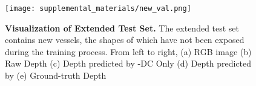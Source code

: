 \begin{table}[!t]
\centering
\caption{\textbf{Inference on Extended Test Set.} We assess the performance of various models using the extended Test set. The arrows beside the metrics denote whether lower or higher values are more desired. }
\label{t3}
\label{tab:new_test_results}
\end{table}


\begin{figure}[t]
\centering
\texttt{[image: supplemental\_materials/new\_val.png]}\\
\caption{\textbf{Visualization of Extended Test Set.} The extended test set contains new vessels, the shapes of which have not been exposed during the training process. From left to right, (a) RGB image (b) Raw Depth (c) Depth predicted by \algoName-DC Only (d) Depth predicted by \algoName (e) Ground-truth Depth
}
\label{fig:visualization_pred_new_obj}
\end{figure}

\clearpage
%  

